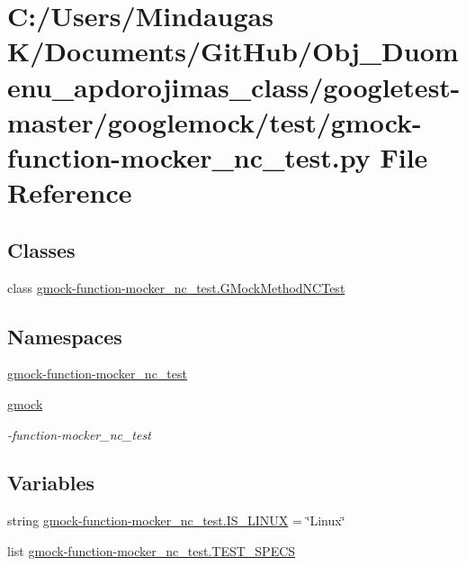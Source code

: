 \hypertarget{googletest-master_2googlemock_2test_2gmock-function-mocker__nc__test_8py}{}\section{C\+:/\+Users/\+Mindaugas K/\+Documents/\+Git\+Hub/\+Obj\+\_\+\+Duomenu\+\_\+apdorojimas\+\_\+class/googletest-\/master/googlemock/test/gmock-\/function-\/mocker\+\_\+nc\+\_\+test.py File Reference}
\label{googletest-master_2googlemock_2test_2gmock-function-mocker__nc__test_8py}
\subsection*{Classes}
\begin{DoxyCompactItemize}
\item 
class \mbox{\hyperlink{classgmock-function-mocker__nc__test_1_1_g_mock_method_n_c_test}{gmock-\/function-\/mocker\+\_\+nc\+\_\+test.\+G\+Mock\+Method\+N\+C\+Test}}
\end{DoxyCompactItemize}
\subsection*{Namespaces}
\begin{DoxyCompactItemize}
\item 
 \mbox{\hyperlink{namespacegmock-function-mocker__nc__test}{gmock-\/function-\/mocker\+\_\+nc\+\_\+test}}
\item 
 \mbox{\hyperlink{namespacegmock}{gmock}}
\begin{DoxyCompactList}\small\item\em -\/function-\/mocker\+\_\+nc\+\_\+test \end{DoxyCompactList}\end{DoxyCompactItemize}
\subsection*{Variables}
\begin{DoxyCompactItemize}
\item 
string \mbox{\hyperlink{namespacegmock-function-mocker__nc__test_a4cc17022e27f8f79f2f7c7c450467a61}{gmock-\/function-\/mocker\+\_\+nc\+\_\+test.\+I\+S\+\_\+\+L\+I\+N\+UX}} = \char`\"{}Linux\char`\"{}
\item 
list \mbox{\hyperlink{namespacegmock-function-mocker__nc__test_a09b8adf2531ae1ea7111c5dfa346e7fa}{gmock-\/function-\/mocker\+\_\+nc\+\_\+test.\+T\+E\+S\+T\+\_\+\+S\+P\+E\+CS}}
\end{DoxyCompactItemize}
